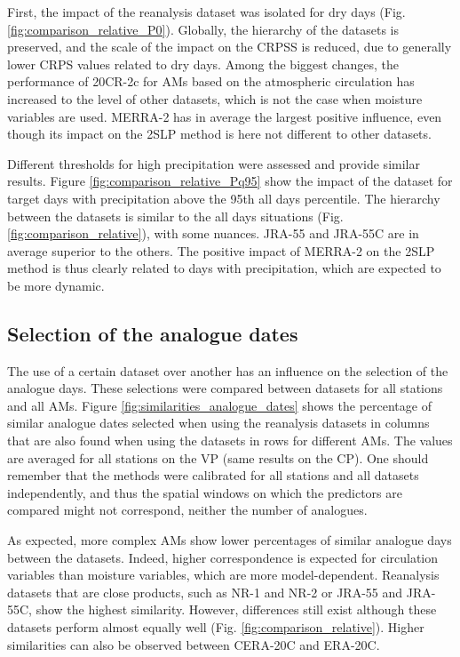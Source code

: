 \documentclass{ametsoc}
\begin{document}
First, the impact of the reanalysis dataset was isolated for dry days (Fig. \ref{fig:comparison_relative_P0}). Globally, the hierarchy of the datasets is preserved, and the scale of the impact on the CRPSS is reduced, due to generally lower CRPS values related to dry days. Among the biggest changes, the performance of 20CR-2c for AMs based on the atmospheric circulation has increased to the level of other datasets, which is not the case when moisture variables are used. MERRA-2 has in average the largest positive influence, even though its impact on the 2SLP method is here not different to other datasets.

Different thresholds for high precipitation were assessed and provide similar results. Figure \ref{fig:comparison_relative_Pq95} show the impact of the dataset for target days with precipitation above the 95th all days percentile. The hierarchy between the datasets is similar to the all days situations (Fig. \ref{fig:comparison_relative}), with some nuances. JRA-55 and JRA-55C are in average superior to the others. The positive impact of MERRA-2 on the 2SLP method is thus clearly related to days with precipitation, which are expected to be more dynamic.


\subsection{Selection of the analogue dates}

The use of a certain dataset over another has an influence on the selection of the analogue days. These selections were compared between datasets for all stations and all AMs. Figure \ref{fig:similarities_analogue_dates} shows the percentage of similar analogue dates selected when using the reanalysis datasets in columns that are also found when using the datasets in rows for different AMs. The values are averaged for all stations on the VP (same results on the CP). One should remember that the methods were calibrated for all stations and all datasets independently, and thus the spatial windows on which the predictors are compared might not correspond, neither the number of analogues.

As expected, more complex AMs show lower percentages of similar analogue days between the datasets. Indeed, higher correspondence is expected for circulation variables than moisture variables, which are more model-dependent. Reanalysis datasets that are close products, such as NR-1 and NR-2 or JRA-55 and JRA-55C, show the highest similarity. However, differences still exist although these datasets perform almost equally well (Fig. \ref{fig:comparison_relative}). Higher similarities can also be observed between CERA-20C and ERA-20C.
\end{document}
